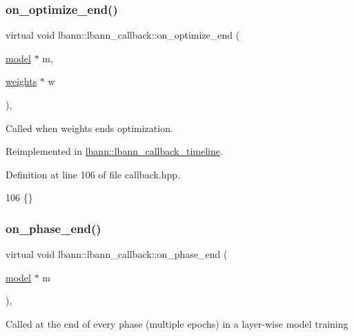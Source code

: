 \subsubsection{\texorpdfstring{on\+\_\+optimize\+\_\+end()}{on\_optimize\_end()}\hspace{0.1cm}{\footnotesize\ttfamily [2/2]}}
{\footnotesize\ttfamily virtual void lbann\+::lbann\+\_\+callback\+::on\+\_\+optimize\+\_\+end (\begin{DoxyParamCaption}\item[{\hyperlink{classlbann_1_1model}{model} $\ast$}]{m,  }\item[{\hyperlink{classlbann_1_1weights}{weights} $\ast$}]{w }\end{DoxyParamCaption})\hspace{0.3cm}{\ttfamily [inline]}, {\ttfamily [virtual]}}

Called when weights ends optimization. 

Reimplemented in \hyperlink{classlbann_1_1lbann__callback__timeline_afdf506e2c2d40c7b0d1f845fb0ed077e}{lbann\+::lbann\+\_\+callback\+\_\+timeline}.



Definition at line 106 of file callback.\+hpp.


\begin{DoxyCode}
106 \{\}
\end{DoxyCode}
\mbox{\label{classlbann_1_1lbann__callback_ace7452239c9ad7aa6247e9496adbcffe}} 
\subsubsection{\texorpdfstring{on\+\_\+phase\+\_\+end()}{on\_phase\_end()}}
{\footnotesize\ttfamily virtual void lbann\+::lbann\+\_\+callback\+::on\+\_\+phase\+\_\+end (\begin{DoxyParamCaption}\item[{\hyperlink{classlbann_1_1model}{model} $\ast$}]{m }\end{DoxyParamCaption})\hspace{0.3cm}{\ttfamily [inline]}, {\ttfamily [virtual]}}

Called at the end of every phase (multiple epochs) in a layer-\/wise model training 

